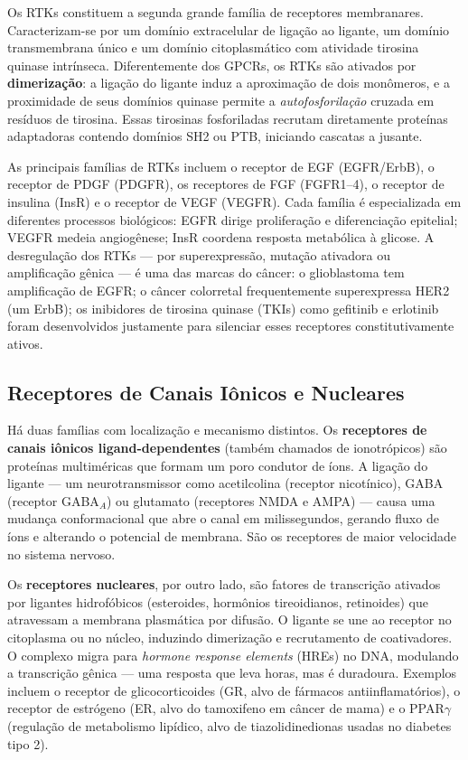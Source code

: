 Os RTKs constituem a segunda grande família de receptores membranares. Caracterizam-se
por um domínio extracelular de ligação ao ligante, um domínio transmembrana único e
um domínio citoplasmático com atividade tirosina quinase intrínseca. Diferentemente
dos GPCRs, os RTKs são ativados por \textbf{dimerização}: a ligação do ligante
induz a aproximação de dois monômeros, e a proximidade de seus domínios quinase
permite a \emph{autofosforilação} cruzada em resíduos de tirosina. Essas
tirosinas fosforiladas recrutam diretamente proteínas adaptadoras contendo
domínios SH2 ou PTB, iniciando cascatas a jusante.

As principais famílias de RTKs incluem o receptor de EGF (EGFR/ErbB), o receptor
de PDGF (PDGFR), os receptores de FGF (FGFR1--4), o receptor de insulina (InsR)
e o receptor de VEGF (VEGFR). Cada família é especializada em diferentes
processos biológicos: EGFR dirige proliferação e diferenciação epitelial;
VEGFR medeia angiogênese; InsR coordena resposta metabólica à glicose. A
desregulação dos RTKs --- por superexpressão, mutação ativadora ou amplificação
gênica --- é uma das marcas do câncer: o glioblastoma tem amplificação de EGFR;
o câncer colorretal frequentemente superexpressa HER2 (um ErbB); os inibidores
de tirosina quinase (TKIs) como gefitinib e erlotinib foram desenvolvidos
justamente para silenciar esses receptores constitutivamente ativos.

\subsection{Receptores de Canais Iônicos e Nucleares}
\label{subsec:09-canais-nucleares}

Há duas famílias com localização e mecanismo distintos. Os \textbf{receptores de
canais iônicos ligand-dependentes} (também chamados de ionotrópicos) são proteínas
multiméricas que formam um poro condutor de íons. A ligação do ligante --- um
neurotransmissor como acetilcolina (receptor nicotínico), GABA (receptor
GABA$_A$) ou glutamato (receptores NMDA e AMPA) --- causa uma mudança
conformacional que abre o canal em milissegundos, gerando fluxo de íons e
alterando o potencial de membrana. São os receptores de maior velocidade
no sistema nervoso.

Os \textbf{receptores nucleares}, por outro lado, são fatores de transcrição
ativados por ligantes hidrofóbicos (esteroides, hormônios tireoidianos,
retinoides) que atravessam a membrana plasmática por difusão. O ligante se une
ao receptor no citoplasma ou no núcleo, induzindo dimerização e recrutamento de
coativadores. O complexo migra para \emph{hormone response elements} (HREs) no
DNA, modulando a transcrição gênica --- uma resposta que leva horas, mas é
duradoura. Exemplos incluem o receptor de glicocorticoides (GR, alvo de
fármacos antiinflamatórios), o receptor de estrógeno (ER, alvo do tamoxifeno em
câncer de mama) e o PPAR$\gamma$ (regulação de metabolismo lipídico, alvo de
tiazolidinedionas usadas no diabetes tipo 2).


